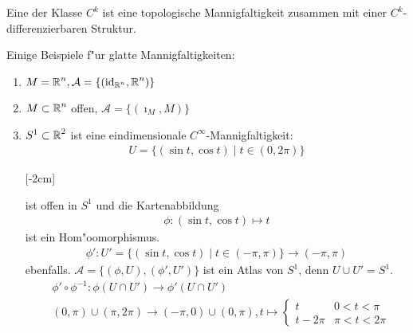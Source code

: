 \begin{Dfn}
  Eine  der Klasse $C^k$ ist eine topologische Mannigfaltigkeit zusammen mit einer $C^{k}$-differenzierbaren Struktur.\\
\end{Dfn}

\begin{bsp}
  Einige Beispiele f"ur glatte Mannigfaltigkeiten:
  \begin{enumerate}[leftmargin=*,label=\arabic*)]
  \item $M = \operatorname{\mathbb{R}}^n, \mathcal A = \{(\operatorname{id}_{\operatorname{\mathbb{R}}^n},\operatorname{\mathbb{R}}^n)\}$
  \item $M \subset \operatorname{\mathbb{R}}^n$ offen, $\mathcal A = \{(\imath_{M},M)\}$
  \item $S^1 \subset \operatorname{\mathbb{R}}^2$ ist eine eindimensionale $C^{\infty}$-Mannigfaltigkeit:
    \begin{align*}
      U = \{(\sin t, \cos t) \mid t \in (0,2\pi)\}
    \end{align*}

    [-2cm]

    ist offen in $S^1$ und die Kartenabbildung
    \begin{align*}
      \phi \colon (\sin t, \cos t) \mapsto t
    \end{align*}
    ist ein Hom"oomorphismus.
    \begin{align*}
      \phi' \colon U' = \{(\sin t, \cos t) \mid t \in (-\pi,\pi)\} \to (-\pi,\pi)
    \end{align*}
    ebenfalls. $\mathcal A = \{(\phi, U), (\phi',U')\}$ ist ein Atlas von $S^1$, denn $U \cup U' = S^1$.
    \begin{align*}
      & \phi' \circ \phi^{-1} \colon \phi(U \cap U') \to \phi'(U \cap U')\\
      & (0,\pi)\cup(\pi,2\pi) \to (-\pi,0)\cup(0,\pi), t \mapsto \begin{cases}
        t & 0 < t < \pi\\
        t-2\pi & \pi < t < 2\pi
      \end{cases}
    \end{align*}


\end{enumerate}
\end{bsp}
